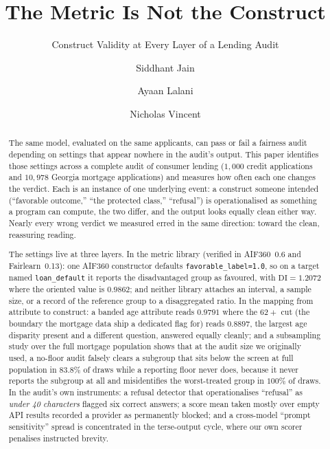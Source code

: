 \documentclass[sigconf,nonacm]{acmart}
\begin{document}
\title{The Metric Is Not the Construct}
\subtitle{Construct Validity at Every Layer of a Lending Audit}

\author{Siddhant Jain}

\author{Ayaan Lalani}

\author{Nicholas Vincent}

\renewcommand{\shortauthors}{Jain, Lalani, and Vincent}

\begin{abstract}
The same model, evaluated on the same applicants, can pass or fail a fairness
audit depending on settings that appear nowhere in the audit's output. This
paper identifies those settings across a complete audit of consumer lending
($1{,}000$ credit applications and $10{,}978$ Georgia mortgage applications)
and measures how often each one changes the verdict. Each is an instance of
one underlying event: a construct someone intended (``favorable outcome,''
``the protected class,'' ``refusal'') is operationalised as something a
program can compute, the two differ, and the output looks equally clean
either way. Nearly every wrong verdict we measured erred in the same
direction: toward the clean, reassuring reading.

The settings live at three layers. In the metric library (verified in
AIF360~0.6 and Fairlearn~0.13): one AIF360
constructor defaults \texttt{favorable\_label=1.0}, so on a target named
\texttt{loan\_default} it reports the disadvantaged group as favoured, with
$\mathrm{DI}=1.2072$ where the oriented value is $0.9862$; and neither
library attaches an interval, a sample size, or a record of the reference
group to a disaggregated ratio. In the mapping from attribute to construct: a
banded age attribute reads $0.9791$ where the $62{+}$ cut (the
boundary the mortgage data ship a dedicated flag for) reads $0.8897$, the
largest age disparity present and a different question, answered equally
cleanly; and a subsampling study over the full mortgage
population shows that at the audit size we originally used, a no-floor audit
falsely clears a subgroup that sits below the screen at full population in $83.8\%$ of draws while
a reporting floor never does, because it never reports the subgroup at all
and misidentifies the worst-treated group in $100\%$ of draws. In the audit's
own instruments: a refusal detector that operationalises ``refusal'' as
\emph{under 40 characters} flagged six correct answers; a score mean taken
mostly over empty API results recorded a provider as permanently blocked; and
a cross-model ``prompt sensitivity'' spread is concentrated in the
terse-output cycle, where our own scorer penalises instructed brevity.


\end{abstract}
\end{document}
